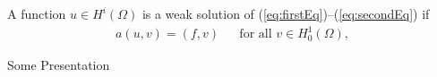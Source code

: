 \documentclass[12pt,leqno]{article}
\numberwithin{equation}{section}
\begin{document}
A function $u \in H^i(\Omega)$ is a weak solution of (\ref{eq:firstEq})--(\ref{eq:secondEq}) if
\begin{align}
\label{eq:thirdEq}
a(u,v) = (f,v) && \text{for all } v \in H_0^1(\Omega),
\end{align}

\begin{thebibliography}{x}
\makeatletter
\addtocounter{\@listctr}{8}
\makeatother

Some Presentation
\end{thebibliography}
\end{document}
